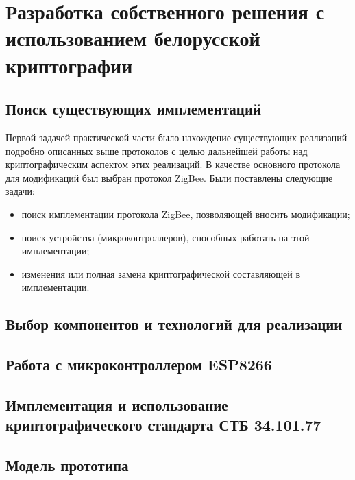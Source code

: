 \chapter{Разработка собственного решения с использованием белорусской криптографии}

	\section{Поиск существующих имплементаций}
	
	Первой задачей практической части было нахождение существующих реализаций подробно описанных
	выше протоколов с целью дальнейшей работы над криптографическим аспектом этих реализаций.
	В качестве основного протокола для модификаций был выбран протокол ZigBee. Были поставлены
	следующие задачи:
	
	\begin{itemize}
		\item поиск имплементации протокола ZigBee, позволяющей вносить модификации; 
		\item поиск устройства (микроконтроллеров), способных работать на этой имплементации;
		\item изменения или полная замена криптографической составляющей в имплементации.
	\end{itemize} 
	
	
	\section{Выбор компонентов и технологий для реализации}
	
	\section{Работа с микроконтроллером ESP8266}
	
	\section{Имплементация и использование криптографического стандарта СТБ 34.101.77}
	
	\section{Модель прототипа}
	